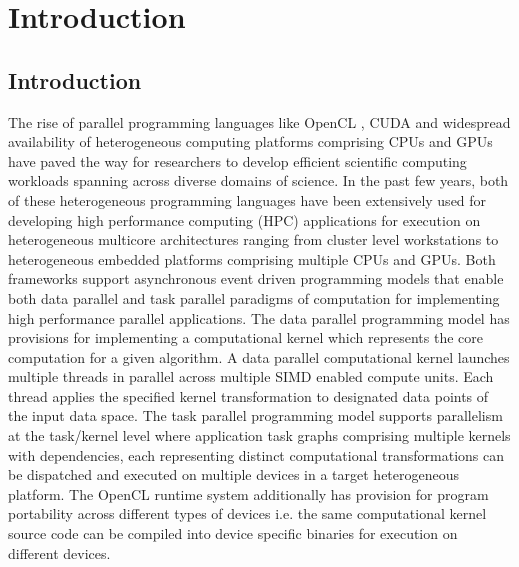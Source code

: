 
\chapter{Introduction} %

\label{Chapter 1} %


\section{Introduction}
    The rise of parallel programming languages like OpenCL \cite{stone2010opencl}, CUDA \cite{nvidia} and widespread availability of heterogeneous computing platforms comprising CPUs and GPUs have paved the way for researchers to develop efficient scientific computing workloads spanning across diverse domains of science. In the past few years, both of these heterogeneous programming languages have been extensively used for developing high performance computing (HPC) applications for execution on heterogeneous multicore architectures ranging from cluster level workstations to heterogeneous embedded platforms comprising multiple CPUs and GPUs. Both frameworks support asynchronous event driven programming models that enable both data parallel and task parallel paradigms of computation for implementing high performance parallel applications. The data parallel programming model has provisions for implementing a computational kernel which represents the core computation for a given algorithm. A data parallel computational kernel launches multiple threads in parallel across multiple SIMD enabled compute units. Each thread applies the specified kernel  transformation to designated data points of the input data space. The task parallel programming model supports parallelism at the task/kernel level where application task graphs comprising multiple kernels with dependencies, each representing distinct computational transformations can be dispatched and executed on  multiple devices in a target heterogeneous platform. The OpenCL runtime system additionally has provision for program portability across different types of devices i.e. the same computational kernel source code can be compiled into device specific binaries for execution on different devices.
    
